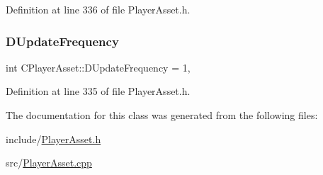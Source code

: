 Definition at line 336 of file Player\+Asset.\+h.

\hypertarget{classCPlayerAsset_ade2147d67ec25b0280d5f11a89dd0dc5}{}\label{classCPlayerAsset_ade2147d67ec25b0280d5f11a89dd0dc5} 
\subsubsection{\texorpdfstring{D\+Update\+Frequency}{DUpdateFrequency}}
{\footnotesize\ttfamily int C\+Player\+Asset\+::\+D\+Update\+Frequency = 1\hspace{0.3cm}{\ttfamily [static]}, {\ttfamily [protected]}}



Definition at line 335 of file Player\+Asset.\+h.



The documentation for this class was generated from the following files\+:\begin{DoxyCompactItemize}
\item 
include/\hyperlink{PlayerAsset_8h}{Player\+Asset.\+h}\item 
src/\hyperlink{PlayerAsset_8cpp}{Player\+Asset.\+cpp}\end{DoxyCompactItemize}
